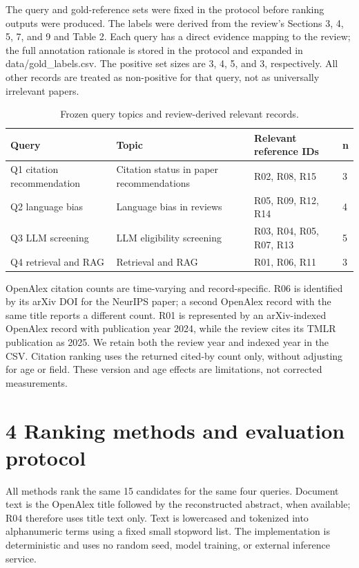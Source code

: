 \documentclass[acmsmall,nonacm]{acmart}
\begin{document}
The query and gold-reference sets were fixed in the protocol before ranking outputs were produced. The labels were derived from the review's Sections 3, 4, 5, 7, and 9 and Table 2. Each query has a direct evidence mapping to the review; the full annotation rationale is stored in the protocol and expanded in data/gold\_labels.csv. The positive set sizes are 3, 4, 5, and 3, respectively. All other records are treated as non-positive for that query, not as universally irrelevant papers.\par

\begin{table}[H]
\caption{Frozen query topics and review-derived relevant records.}
\centering\small
\begin{tabularx}{\linewidth}{XXXX}
\toprule
Query & Topic & Relevant reference IDs & n \\
\midrule
Q1 citation recommendation & Citation status in paper recommendations & R02, R08, R15 & 3 \\
Q2 language bias & Language bias in reviews & R05, R09, R12, R14 & 4 \\
Q3 LLM screening & LLM eligibility screening & R03, R04, R05, R07, R13 & 5 \\
Q4 retrieval and RAG & Retrieval and RAG & R01, R06, R11 & 3 \\
\bottomrule
\end{tabularx}
\end{table}

OpenAlex citation counts are time-varying and record-specific. R06 is identified by its arXiv DOI for the NeurIPS paper; a second OpenAlex record with the same title reports a different count. R01 is represented by an arXiv-indexed OpenAlex record with publication year 2024, while the review cites its TMLR publication as 2025. We retain both the review year and indexed year in the CSV. Citation ranking uses the returned cited-by count only, without adjusting for age or field. These version and age effects are limitations, not corrected measurements.\par

\section*{4 Ranking methods and evaluation protocol}

All methods rank the same 15 candidates for the same four queries. Document text is the OpenAlex title followed by the reconstructed abstract, when available; R04 therefore uses title text only. Text is lowercased and tokenized into alphanumeric terms using a fixed small stopword list. The implementation is deterministic and uses no random seed, model training, or external inference service.\par
\end{document}
